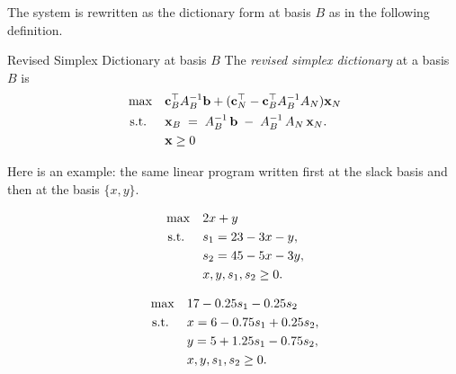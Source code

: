 The system is rewritten as the dictionary form at basis $B$ as in the following definition.

\begin{definition}{Revised Simplex Dictionary at basis $B$}{}
The \emph{revised simplex dictionary} at a basis $B$ is 
\begin{equation}
\label{eq:dictionary-general}
\begin{aligned}
\max \quad & \mathbf{c}_B^\top A_B^{-1}\mathbf{b} + (\mathbf{c}_N^\top -  \mathbf{c}_B^\top A_B^{-1}A_N)\mathbf{x}_N\\
\text{ s.t. } \quad & 
 \mathbf{x}_B 
\;=\;
A_B^{-1}\,\mathbf{b}
\;-\;
A_B^{-1} \,A_N\,\mathbf{x}_N.\\
& \mathbf{x} \geq 0
\end{aligned}
\end{equation}
\end{definition}

Here is an example: the same linear program written first at the slack basis and then at the basis $\{x, y\}$.

\[
\begin{aligned}
\max\quad & 2x + y \\
\text{ s.t. }\quad & s_1 = 23 - 3x - y,\\ 
& s_2 = 45 - 5x - 3y,\\ 
& x, y, s_1, s_2 \ge 0.
\end{aligned}
\]

\[
\begin{aligned}
\max\quad & 17 - 0.25s_1 - 0.25s_2 \\
\text{ s.t. }\quad & x = 6 - 0.75s_1 + 0.25s_2,\\ 
& y = 5 + 1.25s_1 - 0.75s_2,\\ 
& x, y, s_1, s_2 \ge 0.
\end{aligned}
\]

